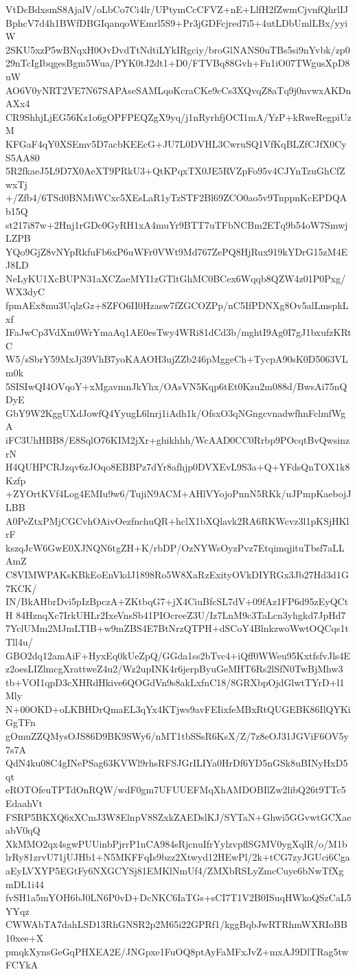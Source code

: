 VtDcBdxsmS8AjalV/oLbCo7Ci4lr/UPtymCcCFVZ+nE+LlfH2fZwmCjvnfQhrlIJ
BphcV7d4h1BWfDBGIqanqoWEmrl5S9+Pr3jGDFcjred7i5+4utLDbUmlLBx/yyiW
2SKU5xzP5wBNqxH0OvDvdTtNdtiLYkIRgciy/broGlNANS0uTBs5si9nYvbk/zp0
29nTcIgIbqgesBgm5Wua/PYK0tJ2dt1+D0/FTVBq88Gvh+Fn1iO07TWgusXpD8uW
AO6V0yNRT2VE7N67SAPAseSAMLqoKcraCKe9cCs3XQvqZ8aTq9j0nvwxAKDnAXx4
CR9ShhjLjEG56Kz1o6gOPFPEQZgX9yq/j1nRyrhfjOCI1mA/YzP+kRweRegpiUzM
KFGaF4qY0XSEmv5D7acbKEEcG+JU7L0DVHL3CwruSQ1VfKqBLZfCJfX0CyS5AA80
5R2fkaeJ5L9D7X0AeXT9PRkU3+QtKPqxTX0JE5RVZpFo95v4CJYnTzuGhCfZwxTj
+/Zfb4/6TSd0BNMiWCxc5XEsLaR1yTzSTF2Bl69ZCO0ao5v9TnppnKcEPDQAb15Q
st217i87w+2Hnj1rGDc0GyRH1xA4muYr9BTT7uTFbNCBm2ETq9b54oW7SmwjLZPB
YQo9GjZ8vNYpRkfuFb6xP6uWFr0VWt9Md767ZePQ8HjRux919kYDrG15zM4EJ8LD
NeLyKU1XcBUPN31aXCZaeMYI1zGTltGhMC0BCex6Wqqb8QZW4z01P0Pxg/WX3dyC
fpmAEx8mu3UqlzGz+8ZFO6II0Hzasw7fZGCOZPp/nC5IfPDNXg8Ov5alLmspkLxf
IFaJwCp3VdXm0WrYmaAq1AE0esTwy4WRi81dCd3b/mghtI9Ag0I7gJ1bxufzKRtC
W5/sSbrY59MxJj39VhB7yoKAAOH3ujZZb246pMggeCh+TycpA90sK0D5063VLm0k
5SISIwQI4OVqoY+xMgavmnJkYhx/OAsVN5Kqp6tEt0Kzu2m088d/BwsAi75nQDyE
GbY9W2KggUXdJowfQ4YyugL6lnrj1iAdh1k/OfsxO3qNGngcvnadwfhnFclmfWgA
iFC3UhHBB8/E8SqlO76KIM2jXr+ghikhhh/WcAAD0CC0Rrbp9POcqtBvQwsinzrN
H4QUHPCRJzqv6zJOqo8EBBPz7dYr8afhjp0DVXEvL9S3a+Q+YFdsQnTOX1k8Kzfp
+ZYOrtKVf4Log4EMIu9w6/TujiN9ACM+AHlVYojoPnnN5RKk/uJPmpKaebojJLBB
A0PeZtxPMjCGCvhOAivOezfnchuQR+hclX1bXQlavk2RA6RKWcvz3l1pKSjHKlrF
kszqJcW6GwE0XJNQN6tgZH+K/rbDP/OzNYWsOyzPvz7EtqimqjituTbsf7aLLAmZ
C8VIMWPAKsKBkEoEnVkdJ1898Ro5W8XaRzExityOVkDIYRGx3Jb27Hd3d1G7KCK/
IN/BkAHbrDvi5pIzBpczA+ZKtbqG7+jX4CiuBfcSL7dV+09fAz1FP6d95zEyQCtH
84HznqXc7IrkUHLr2IxeVnsSb41PIOcreeZ3U/Iz7LnM9c3TaLcn3yhgkd7JpHd7
7YclUMm2MJmLTIB+w9mZBS4E7BtNrzQTPH+dSCoY4BlnkzwoWwtOQCqs1tTll4u/
GBO2dq12amAiF+HyxEq0kUeZpQ/GGda1ss2bTvc4+iQff0WWeu95KxtfsfvJls4E
z2oesLIZlmcgXrattweZ4u2/Wz2upINK4r6jerpByuGeMHT6Rs2lSfN0TwBjMhw3
tb+VOI1qpD3cXHRdHkive6QOGdVn9s8akLxfnC18/8GRXbpOjdGlwtTYrD+l1Mly
N+00OKD+oLKBHDrQmaEL3qYx4KTjws9avFEIixfeMBxRtQUGEBK86IlQYKiGgTFn
gOmuZZQMysOJS86D9BK9SWy6/nMT1tbSSsR6KsX/Z/7z8eOJ31JGViF6OV5y7s7A
QdN4ku08C4gINePSag63KVWl9rhsRFSJGrILIYa0HrDf6YD5nGSk8uBINyHxD5qt
eROTOfeuTPTdOnRQW/wdF0gm7UFUUEFMqXhAMDOBIlZw2libQ26t9TTc5EdaahVt
FSRP5BKXQ6xXCmJ3W8ElnpV8SZxkZAEDslKJ/SYTaN+Ghwi5GGvwtGCXaeabV0qQ
XkMMO2qx4sgwPUUinbPjrrP1nCA984sRjcnuIfrYylzvpflSGMV0ygXqlR/o/M1b
lrRy81zrvU71jUJHb1+N5MKFFqIs9bzz2Xtwyd12HEwPl/2k+tCG7zyJGUci6Cga
aEyLVXYP5EGtFy6NXGCYSj81EMKlNmUf4/ZMXbRSLyZmcCuye6bNwTfXgmDL1i44
fvSH1a5mYOH6bJ0LN6P0vD+DcNKC6IaTGs+sCI7T1V2B0ISuqHWkoQSzCaL5YYqz
CWWAbTA7dahLSD13RhGNSR2p2M65i22GPRf1/kggBqbJwRTRhmWXRIoBB10xee+X
pmqkXynsGeGqPHXEA2E/JNGpxe1FuOQ8ptAyFaMFxJvZ+mxAJ9DlTRag5twFCYkA
